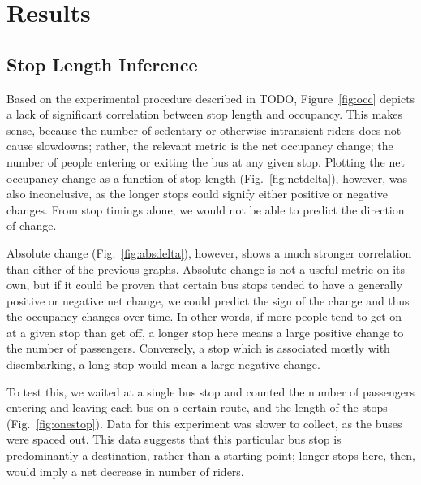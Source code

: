 \section{Results}

\subsection{Stop Length Inference}

Based on the experimental procedure described in TODO, Figure~\ref{fig:occ} depicts a lack of significant correlation between stop length and occupancy.
This makes sense, because the number of sedentary or otherwise intransient riders does not cause slowdowns; rather, the relevant metric is the net occupancy change; the number of people entering or exiting the bus at any given stop.
Plotting the net occupancy change as a function of stop length (Fig.~\ref{fig:netdelta}), however, was also inconclusive, as the longer stops could signify either positive or negative changes.
From stop timings alone, we would not be able to predict the direction of change.

Absolute change (Fig.~\ref{fig:absdelta}), however, shows a much stronger correlation than either of the previous graphs.
Absolute change is not a useful metric on its own, but if it could be proven that certain bus stops tended to have a generally positive or negative net change, we could predict the sign of the change and thus the occupancy changes over time.
In other words, if more people tend to get on at a given stop than get off, a longer stop here means a large positive change to the number of passengers.
Conversely, a stop which is associated mostly with disembarking, a long stop would mean a large negative change.

To test this, we waited at a single bus stop and counted the number of passengers entering and leaving each bus on a certain route, and the length of the stops (Fig.~\ref{fig:onestop}).
Data for this experiment was slower to collect, as the buses were spaced out.
This data suggests that this particular bus stop is predominantly a destination, rather than a starting point; longer stops here, then, would imply a net decrease in number of riders.
    
